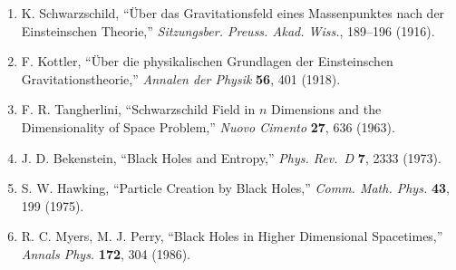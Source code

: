 \documentclass[a4paper,11pt]{ltjsarticle}
\theoremstyle{definition}
\providecommand{\tightlist}{\setlength{\itemsep}{0pt}\setlength{\parskip}{0pt}}
\begin{document}
\begin{enumerate}
\def\labelenumi{\arabic{enumi}.}
\tightlist
\item
  K. Schwarzschild, ``Über das Gravitationsfeld eines Massenpunktes nach
  der Einsteinschen Theorie,'' \emph{Sitzungsber. Preuss. Akad. Wiss.},
  189--196 (1916).
\item
  F. Kottler, ``Über die physikalischen Grundlagen der Einsteinschen
  Gravitationstheorie,'' \emph{Annalen der Physik} \textbf{56}, 401
  (1918).
\item
  F. R. Tangherlini, ``Schwarzschild Field in \(n\) Dimensions and the
  Dimensionality of Space Problem,'' \emph{Nuovo Cimento} \textbf{27},
  636 (1963).
\item
  J. D. Bekenstein, ``Black Holes and Entropy,'' \emph{Phys. Rev.~D}
  \textbf{7}, 2333 (1973).
\item
  S. W. Hawking, ``Particle Creation by Black Holes,'' \emph{Comm. Math.
  Phys.} \textbf{43}, 199 (1975).
\item
  R. C. Myers, M. J. Perry, ``Black Holes in Higher Dimensional
  Spacetimes,'' \emph{Annals Phys.} \textbf{172}, 304 (1986).
\end{enumerate}
\end{document}
